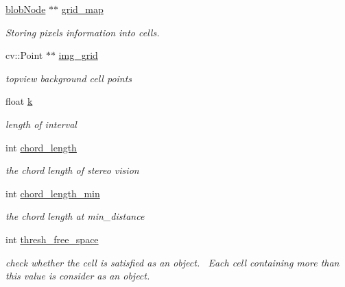 \begin{DoxyCompactItemize}
\item 
\hypertarget{class_top_view_a54a832929e3763160213c25f0a543128}{}\hyperlink{struct_top_view_1_1blob_node}{blob\+Node} $\ast$$\ast$ \hyperlink{class_top_view_a54a832929e3763160213c25f0a543128}{grid\+\_\+map}\label{class_top_view_a54a832929e3763160213c25f0a543128}

\begin{DoxyCompactList}\small\item\em Storing pixels\textquotesingle{} information into cells. \end{DoxyCompactList}\item 
\hypertarget{class_top_view_a72de1afcef91e63df47886fc162da3f6}{}cv\+::\+Point $\ast$$\ast$ \hyperlink{class_top_view_a72de1afcef91e63df47886fc162da3f6}{img\+\_\+grid}\label{class_top_view_a72de1afcef91e63df47886fc162da3f6}

\begin{DoxyCompactList}\small\item\em topview background cell points \end{DoxyCompactList}\item 
\hypertarget{class_top_view_a1f2b530e7979db621630dbbf9f5def15}{}float \hyperlink{class_top_view_a1f2b530e7979db621630dbbf9f5def15}{k}\label{class_top_view_a1f2b530e7979db621630dbbf9f5def15}

\begin{DoxyCompactList}\small\item\em length of interval \end{DoxyCompactList}\item 
\hypertarget{class_top_view_a7b492b7926c48542bdad6610a602eadc}{}int \hyperlink{class_top_view_a7b492b7926c48542bdad6610a602eadc}{chord\+\_\+length}\label{class_top_view_a7b492b7926c48542bdad6610a602eadc}

\begin{DoxyCompactList}\small\item\em the chord length of stereo vision \end{DoxyCompactList}\item 
\hypertarget{class_top_view_ab5a42f3e0ca928ea973c052c538ba354}{}int \hyperlink{class_top_view_ab5a42f3e0ca928ea973c052c538ba354}{chord\+\_\+length\+\_\+min}\label{class_top_view_ab5a42f3e0ca928ea973c052c538ba354}

\begin{DoxyCompactList}\small\item\em the chord length at min\+\_\+distance \end{DoxyCompactList}\item 
\hypertarget{class_top_view_a0be83119f0e81bbfd89f75b6d271eb2b}{}int \hyperlink{class_top_view_a0be83119f0e81bbfd89f75b6d271eb2b}{thresh\+\_\+free\+\_\+space}\label{class_top_view_a0be83119f0e81bbfd89f75b6d271eb2b}

\begin{DoxyCompactList}\small\item\em check whether the cell is satisfied as an object.~\newline
 Each cell containing more than this value is consider as an object. \end{DoxyCompactList}\end{DoxyCompactItemize}
